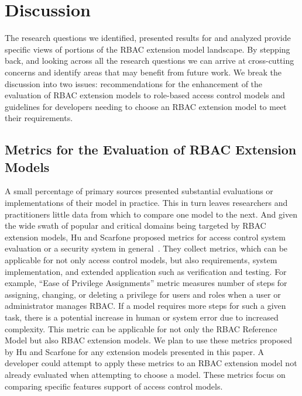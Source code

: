 \section{Discussion} \label{sec:discussion}

The research questions we identified, presented results for and analyzed provide specific views of portions of the RBAC extension model landscape. 
By stepping back, and looking across all the research questions we can arrive at cross-cutting concerns and identify areas that may benefit from future work.
We break the discussion into two issues: recommendations for the enhancement of the evaluation of RBAC extension models to role-based access control models and guidelines for developers needing to choose an RBAC extension model to meet their requirements.

\subsection{Metrics for the Evaluation of RBAC Extension Models}

A small percentage of primary sources presented substantial evaluations or implementations of their model in practice.  This in turn leaves researchers and practitioners little data from which to compare one model to the next. And given the wide swath of popular and critical domains being targeted by RBAC extension models, Hu and Scarfone proposed metrics for access control system evaluation or a security system in general~\cite{hu2012:NIST7874}. They collect metrics, which can be applicable for not only access control models, but also requirements, system implementation, and extended application such as verification and testing. For example, ``Ease of Privilege Assignments'' metric measures number of steps for assigning, changing, or deleting a privilege for users and roles when a user or administrator manages RBAC. If a model requires more steps for such a given task, there is a potential increase in human or system error due to increased complexity. This metric can be applicable for not only the RBAC Reference Model but also RBAC extension models.
We plan to use these metrics proposed by Hu and Scarfone for any extension models presented in this paper. 
A developer could attempt to apply these metrics to an RBAC extension model not already evaluated when attempting to choose a model. 
These metrics focus on comparing specific features support of access control models.


